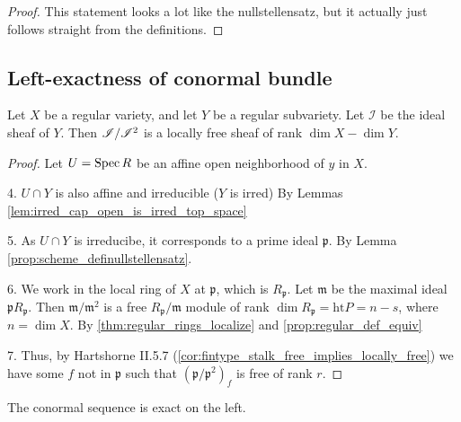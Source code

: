 \begin{corollary}
\begin{proof}
  This statement looks a lot like the nullstellensatz,
  but it actually just follows straight from the
  definitions.
\end{proof}

\subsection{Left-exactness of conormal bundle}


\begin{lemma}
  \label{lem:reg_subvar_conormal_locally_free}
  Let $X$ be a regular variety, and let $Y$ be a regular
  subvariety.
  Let $\mathcal{I}$ be the ideal sheaf of $Y$.
  Then $\mathscr{I} / \mathscr{I}^{2}$ is a locally free sheaf of rank 
  $\dim X - \dim Y$.
\end{lemma}

\begin{proof}

  Let $U = \operatorname{Spec} R$ be an affine open neighborhood of $y$ in $X$.
  
  4. $U \cap Y$ is also affine and irreducible ($Y$ is irred)
     By Lemmas \ref{lem:irred_cap_open_is_irred_top_space}

  5. As $U \cap Y$ is irreducibe, it corresponds to a prime ideal
     $\mathfrak{p}$.
     By Lemma \ref{prop:scheme_definullstellensatz}.

  6. We work in the local ring of $X$ at $\mathfrak{p}$, which is $R_\mathfrak{p}$.
     Let $\mathfrak{m}$ be the maximal ideal $\mathfrak{p} R_\mathfrak{p}$.
     Then $\mathfrak{m} / \mathfrak{m}^2$ is a free 
     $R_\mathfrak{p} / \mathfrak{m}$ module of rank
     $\dim R_\mathfrak{p} = \text{ht} P = n-s$, where $n = \dim X$.
     By \ref{thm:regular_rings_localize} and \ref{prop:regular_def_equiv}


  7. Thus, by Hartshorne II.5.7 
     (\ref{cor:fintype_stalk_free_implies_locally_free}) 
     we have some $f$ not in $\mathfrak{p}$
     such that $(\mathfrak{p} / \mathfrak{p}^2)_f$ is free of rank $r$.
\end{proof}

\begin{theorem}
  \label{thm:regular_implies_conormal_exact}
  The conormal sequence is exact on 
  the left.
\end{theorem}


\end{corollary}
